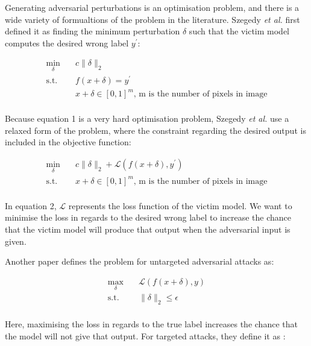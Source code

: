 \documentclass[11pt, a4paper, oneside]{article}
\begin{document}
Generating adversarial perturbations is an optimisation problem, and there is a wide variety of formualtions of the problem in the literature. Szegedy \textit{et al.} \cite{szegedy2014intriguing} first defined it as finding the minimum perturbation $\delta$ such that the victim model computes the desired wrong label $y^\prime$:

\begin{equation}
\begin{aligned}
\min_{\delta} \quad & c\|\delta\|_2\\
\textrm{s.t.} \quad & f(x + \delta) = y^\prime\\
  &x + \delta \in [0,1]^m \textrm{, m is the number of pixels in image}   \\
\end{aligned}
\end{equation}

Because equation 1 is a very hard optimisation problem, Szegedy \textit{et al.} \cite{szegedy2014intriguing} use a relaxed form of the problem, where the constraint regarding the desired output is included in the objective function:

\begin{equation}
\begin{aligned}
\min_{\delta} \quad & c\|\delta\|_2 + \mathcal{L}(f(x + \delta), y^\prime)\\
\textrm{s.t.} \quad& x + \delta \in [0,1]^m \textrm{, m is the number of pixels in image}   \\
\end{aligned}
\end{equation}

In equation 2, $\mathcal{L}$ represents the loss function of the victim model. We want to minimise the loss in regards to the desired wrong label to increase the chance that the victim model will produce that output when the adversarial input is given.

Another paper \cite{silva_survey} defines the problem for untargeted adversarial attacks as:

\begin{equation}
\begin{aligned}
\max_{\delta} \quad & \mathcal{L}(f(x + \delta), y)\\
\textrm{s.t.} \quad& \|\delta\|_2\leq\epsilon   \\
\end{aligned}
\end{equation}

Here, maximising the loss in regards to the true label increases the chance that the model will not give that output. For targeted attacks, they define it as :
\end{document}
